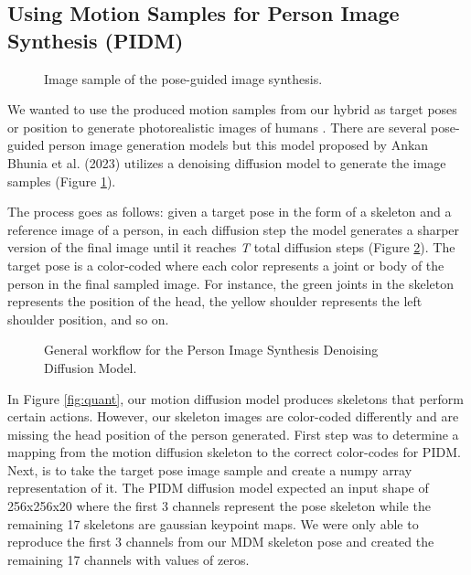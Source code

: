 \documentclass[10pt,twocolumn,letterpaper]{article}
\begin{document}
\subsection{Using Motion Samples for Person Image Synthesis (PIDM)}

\begin{figure}[H]
    \centering

    \caption{Image sample of the pose-guided image synthesis.}
    \label{fig:pidm-0}
\end{figure}

We wanted to use the produced motion samples from our hybrid as target poses or position to generate 
photorealistic images of humans \cite{Bhunia23}. There are several pose-guided person image generation
models but this model proposed by Ankan Bhunia et al. (2023) utilizes a denoising diffusion model to
generate the image samples (Figure \ref{fig:pidm-0}).

The process goes as follows: given a target pose in the form of a skeleton and a reference image 
of a person, in each diffusion step the model generates a sharper version of the final image until it
reaches \emph{T} total diffusion steps (Figure \ref{fig:pidm-1}). The target pose is a color-coded where
each color represents a joint or body of the person in the final sampled image. For instance, the green 
joints in the skeleton represents the position of the head, the yellow shoulder represents the left shoulder 
position, and so on.

\begin{figure}[H]
    \centering

    \caption{General workflow for the Person Image Synthesis Denoising Diffusion Model.}
    \label{fig:pidm-1}
\end{figure}

In Figure \ref{fig:quant}, our motion diffusion model produces skeletons that perform certain actions. 
However, our skeleton images are color-coded differently and are missing the head position of the person 
generated. First step was to determine a mapping from the motion diffusion skeleton to the correct color-codes 
for PIDM. Next, is to take the target pose image sample and create a numpy array representation of it. The PIDM 
diffusion model expected an input shape of 256x256x20 where the first 3 channels represent the pose skeleton 
while the remaining 17 skeletons are gaussian keypoint maps. We were only able to reproduce the first 3 channels 
from our MDM skeleton pose and created the remaining 17 channels with values of zeros.
\end{document}
